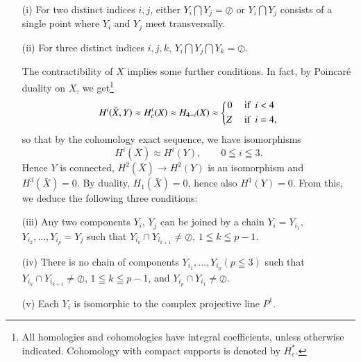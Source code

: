 \begin{itemize}
\item[(i)] For two distinct indices $i, j$, either $Y_i \bigcap Y_j = \oslash$ or $Y_i \bigcap Y_j$ consists of a single point where $Y_i$ and $Y_j$ meet transversally.   

\item[(ii)] For three distinct indices $i,j,k$, $Y_i \bigcap Y_j \bigcap Y_k = \oslash$.

The contractibility of $X$ implies some further conditions. In fact, by Poincar\'e duality on $X$, we get\footnote{All homologies and cohomologies have integral coefficients, unless otherwise indicated. Cohomology with compact supports is denoted by $H^*_c$.}
\begin{equation*}
H^i (\bar{X}, Y) \approx H^i_c (X) \approx H_{4-i} (X) \approx 
\left\{
\begin{aligned}
0 & \text{ \quad if~ } i < 4\\
Z & \text{ \quad if~ } i = 4,
\end{aligned}
\right.
\end{equation*}
so that by the cohomology exact sequence, we have isomorphisms
$$
H^i (\bar{X}) \approx H^i (Y), \qquad 0 \leqq i \leqq 3.
$$
Hence $Y$ is connected, $H^2 (\bar{X}) \to H^2 (Y)$ is an isomorphism and $H^3 (\bar{X}) =0$. By duality, $H_1 (\bar{X}) =0$, hence also $H^1(Y) =0$. From this, we deduce the following three conditions:

\item[(iii)] Any two components $Y_i$, $Y_j$ can be joined by a chain $Y_i = Y_{i_1}$, $Y_{i_2}, \ldots, Y_{i_p} = Y_j$ such that $Y_{i_k} \cap Y_{i_{k+1}} \neq \oslash$, $1 \leqq k \leqq p -1$.

\item[(iv)] There is no chain of components $Y_{i_1} , \ldots, Y_{i_p} (p \leqq 3)$ such that $Y_{i_k} \cap Y_{i_{k+1}} \neq \oslash$, $1 \leqq k\leqq p -1$, and $Y_{i_p} \cap Y_{i_1} \neq \oslash$.

\item[(v)] Each $Y_i$ is isomorphic to the complex projective line $P^1$.


\end{itemize}
